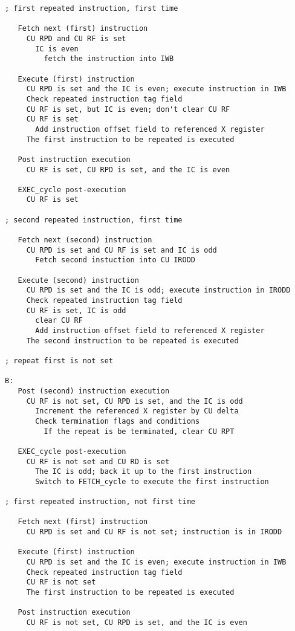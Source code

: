 \documentclass[notitlepage]{report}
\begin{document}
\begin{verbatim}
; first repeated instruction, first time

   Fetch next (first) instruction
     CU RPD and CU RF is set
       IC is even
         fetch the instruction into IWB

   Execute (first) instruction
     CU RPD is set and the IC is even; execute instruction in IWB
     Check repeated instruction tag field
     CU RF is set, but IC is even; don't clear CU RF
     CU RF is set
       Add instruction offset field to referenced X register
     The first instruction to be repeated is executed

   Post instruction execution
     CU RF is set, CU RPD is set, and the IC is even

   EXEC_cycle post-execution
     CU RF is set

; second repeated instruction, first time

   Fetch next (second) instruction
     CU RPD is set and CU RF is set and IC is odd
       Fetch second instuction into CU IRODD

   Execute (second) instruction
     CU RPD is set and the IC is odd; execute instruction in IRODD
     Check repeated instruction tag field
     CU RF is set, IC is odd
       clear CU RF
       Add instruction offset field to referenced X register
     The second instruction to be repeated is executed

; repeat first is not set

B:
   Post (second) instruction execution
     CU RF is not set, CU RPD is set, and the IC is odd
       Increment the referenced X register by CU delta
       Check termination flags and conditions
         If the repeat is be terminated, clear CU RPT

   EXEC_cycle post-execution
     CU RF is not set and CU RD is set
       The IC is odd; back it up to the first instruction
       Switch to FETCH_cycle to execute the first instruction

; first repeated instruction, not first time

   Fetch next (first) instruction
     CU RPD is set and CU RF is not set; instruction is in IRODD

   Execute (first) instruction
     CU RPD is set and the IC is even; execute instruction in IWB
     Check repeated instruction tag field
     CU RF is not set
     The first instruction to be repeated is executed

   Post instruction execution
     CU RF is not set, CU RPD is set, and the IC is even


\end{verbatim}
\end{document}
